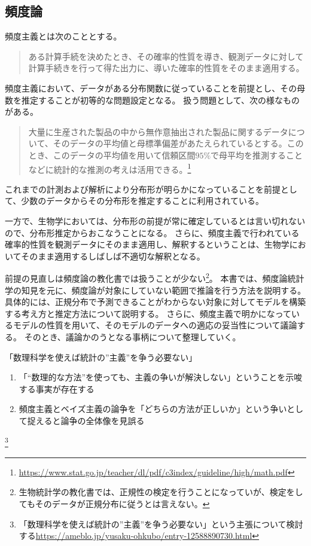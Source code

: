 \subsection{頻度論}
\begin{defi}
頻度主義とは次のこととする\cite{efron2020大規模計算時代の統計推論}。
  \begin{quote} ある計算手続を決めたとき、その確率的性質を導き、観測データに対して計算手続きを行って得た出力に、導いた確率的性質をそのまま適用する。
  \end{quote} 
\end{defi}

頻度主義において、データがある分布関数に従っていることを前提とし、その母数を推定することが初等的な問題設定となる。
扱う問題として、次の様なものがある。
\begin{quote} 大量に生産された製品の中から無作意抽出された製品に関するデータについて、そのデータの平均値と母標準偏差があたえられているとする。このとき、このデータの平均値を用いて信頼区間$95\%$で母平均を推測することなどに統計的な推測の考えは活用できる。\footnote{\url{https://www.stat.go.jp/teacher/dl/pdf/c3index/guideline/high/math.pdf}}
\end{quote}
これまでの計測および解析により分布形が明らかになっていることを前提として、少数のデータからその分布形を推定することに利用されている。

一方で、生物学においては、分布形の前提が常に確定しているとは言い切れないので、分布形推定からおこなうことになる。
さらに、頻度主義で行われている確率的性質を観測データにそのまま適用し、解釈するということは、生物学においてそのまま適用するしばしば不適切な解釈となる。

前提の見直しは頻度論の教化書では扱うことが少ない\footnote{生物統計学の教化書では、正規性の検定を行うことになっていが、検定をしてもそのデータが正規分布に従うとは言えない。}。
本書では、頻度論統計学の知見を元に、頻度論が対象にしていない範囲で推論を行う方法を説明する。
具体的には、正規分布で予測できることがわからない対象に対してモデルを構築する考え方と推定方法について説明する。
さらに、頻度主義で明かになっているモデルの性質を用いて、そのモデルのデータへの適応の妥当性について議論する。
そのとき、議論かのうとなる事柄について整理していく。

\begin{SMbox}{「数理科学を使えば統計の”主義”を争う必要ない」}
 \begin{enumerate}
  \item 「“数理的な方法”を使っても、主義の争いが解決しない」ということを示唆する事実が存在する
  \item 頻度主義とベイズ主義の論争を「どちらの方法が正しいか」という争いとして捉えると論争の全体像を見誤る
 \end{enumerate}\footnote{「数理科学を使えば統計の”主義”を争う必要ない」という主張について検討する\url{https://ameblo.jp/yusaku-ohkubo/entry-12588890730.html}}

\end{SMbox}

